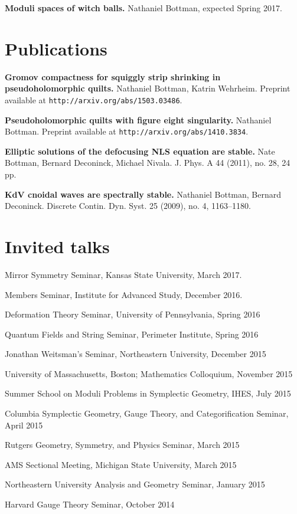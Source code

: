 \documentclass[margin,line]{res}
\begin{document}
\begin{resume}
{\bf Moduli spaces of witch balls.}  Nathaniel Bottman, expected Spring 2017.

\medskip

\section{\sc Publications}
{\bf Gromov compactness for squiggly strip shrinking in pseudoholomorphic quilts.}  Nathaniel Bottman, Katrin Wehrheim.  Preprint available at \texttt{http://arxiv.org/abs/1503.03486}.

{\bf Pseudoholomorphic quilts with figure eight singularity.}  Nathaniel Bottman.  Preprint available at \texttt{http://arxiv.org/abs/1410.3834}.

{\bf Elliptic solutions of the defocusing NLS equation are stable.}  Nate Bottman, Bernard Deconinck, Michael Nivala.  J. Phys. A 44 (2011), no. 28, 24 pp.

{\bf KdV cnoidal waves are spectrally stable.}  Nathaniel Bottman, Bernard Deconinck.  Discrete Contin. Dyn. Syst. 25 (2009), no. 4, 1163--1180.

\section{\sc Invited talks}
Mirror Symmetry Seminar, Kansas State University, March 2017.

Members Seminar, Institute for Advanced Study, December 2016.

Deformation Theory Seminar, University of Pennsylvania, Spring 2016 

Quantum Fields and String Seminar, Perimeter Institute, Spring 2016

Jonathan Weitsman's Seminar, Northeastern University, December 2015

University of Massachusetts, Boston; Mathematics Colloquium, November 2015

Summer School on Moduli Problems in Symplectic Geometry, IHES, July 2015

Columbia Symplectic Geometry, Gauge Theory, and Categorification Seminar, April 2015

Rutgers Geometry, Symmetry, and Physics Seminar, March 2015

AMS Sectional Meeting, Michigan State University, March 2015

Northeastern University Analysis and Geometry Seminar, January 2015

Harvard Gauge Theory Seminar, October 2014


\end{resume}
\end{document}
